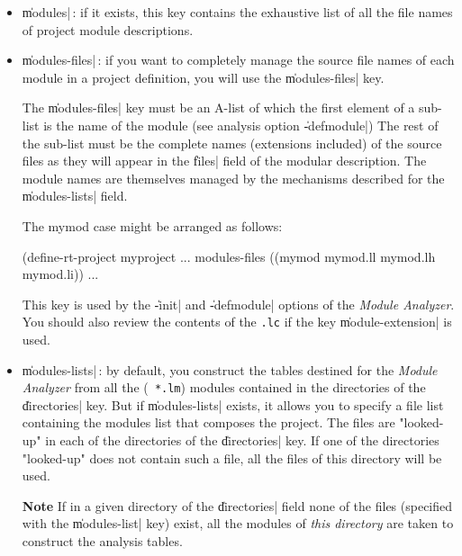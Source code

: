\begin{itemize}
\begin{Side}{\bf Warning}
You should probably not use \|module-extension| with the analysis option \|-r|.  In effect, a recursive analysis does not guarantee the coherence of "{\tt .lc}"s with the "{\tt .lm}s".  This guarantee is made, rather, by the analysis {\tt Makefile}. 
\end{Side}

\item {\Large \|modules|}\,: if it exists, this key contains the exhaustive list of all the file names of project module descriptions.

\item {\Large \|modules-files|}\,: if you want to completely manage the source file names of each module in a project definition, you will use the \|modules-files| key.  

The \|modules-files| key must be an A-list of which the first element of a sub-list is the name of the module (see analysis option \|-defmodule|) The rest of the sub-list must be the complete names (extensions included) of the source files as they will appear in the \|files| field of the modular description.  The module names are themselves managed by the mechanisms described for the \|modules-lists| field.
\begin{Code*}
The mymod case might be arranged as follows:

(define-rt-project myproject
  ...
  modules-files ((mymod mymod.ll mymod.lh mymod.li))
  ...
\end{Code*}
This key is used by the \|-init| and \|-defmodule| options of the {\em Module Analyzer}.
You should also review the contents of the {\tt .lc} if the key \|module-extension| is used.

\item {\Large \|modules-lists|}\,: by default, you construct
the tables destined for the {\em Module Analyzer} from all the ({\tt
*.lm})  modules contained in the directories of the \|directories|
key.  But if  \|modules-lists| exists, it allows you to specify a file
list containing the modules list that composes the project.  The files
are "looked-up" in each of the directories of the \|directories| key.
If one of the directories "looked-up" does not contain such a file,
all the files of this directory will be used.

\begin{Side}{\bf Note}
If in a given directory of the \|directories| field none of the files 
(specified with the \|modules-list| key) exist, all the modules of 
{\em this directory} are taken to construct the analysis tables.
\end{Side}


\end{itemize}
